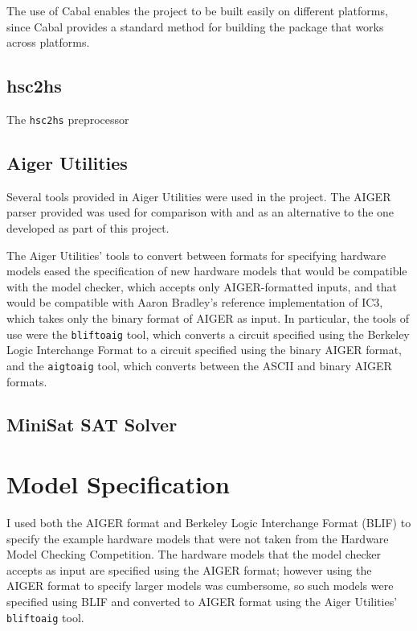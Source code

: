 \documentclass[12pt,a4paper,twoside,openright]{report}
\begin{document}

The use of Cabal enables the project to be built easily on different platforms,
since Cabal provides a standard method for building the package that works
across platforms.



\subsection{hsc2hs}

The \verb,hsc2hs, preprocessor 

\subsection{Aiger Utilities}
Several tools provided in Aiger Utilities were used in the project. The
AIGER parser provided was used for comparison with and as an alternative
to the one developed as part of this project. 

The Aiger Utilities' tools to convert between formats for specifying
hardware models eased the specification of new hardware models that would
be compatible with the model checker, which accepts only AIGER-formatted inputs,
and that would be compatible with  Aaron Bradley's reference implementation of IC3,
which takes only the binary format of AIGER as input.
In particular, the tools of use were
the {\tt bliftoaig}
tool, which converts a circuit specified using the Berkeley Logic Interchange Format
to a circuit specified using the binary AIGER format, and the {\tt aigtoaig} tool,
which converts between the ASCII and binary AIGER formats.

\subsection{MiniSat SAT Solver}


\section{Model Specification}


I used both the AIGER format and Berkeley Logic Interchange Format (BLIF)
to specify the example hardware models that were not taken from the
Hardware Model Checking Competition.
The hardware models that the model checker accepts as input
are specified using the AIGER format;
however using the AIGER format to specify larger models was cumbersome,
so such models were specified using BLIF and converted to AIGER format
using the Aiger Utilities' \verb,bliftoaig, tool.
\end{document}
